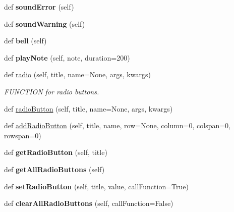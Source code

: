 \begin{DoxyCompactItemize}
def {\bfseries sound\+Error} (self)
\item 
\mbox{\label{classappjar_1_1gui_a6f9781af1a88faa13b56a107f7cbe112}} 
def {\bfseries sound\+Warning} (self)
\item 
\mbox{\label{classappjar_1_1gui_a4eadecf4e77b7711aad3b9bdeba914fc}} 
def {\bfseries bell} (self)
\item 
\mbox{\label{classappjar_1_1gui_a6b6baed3fcc616515c191c38115c80b7}} 
def {\bfseries play\+Note} (self, note, duration=200)
\item 
def \hyperlink{classappjar_1_1gui_af5cc0fdb337b9cccf09708697e0e4640}{radio} (self, title, name=None, args, kwargs)
\begin{DoxyCompactList}\small\item\em F\+U\+N\+C\+T\+I\+ON for radio buttons. \end{DoxyCompactList}\item 
def \hyperlink{classappjar_1_1gui_a124d04efc7d2e554655f0f1a8c7f4177}{radio\+Button} (self, title, name=None, args, kwargs)
\item 
def \hyperlink{classappjar_1_1gui_a43740305a4b98237f344c3228d593467}{add\+Radio\+Button} (self, title, name, row=None, column=0, colspan=0, rowspan=0)
\item 
\mbox{\label{classappjar_1_1gui_a3a862f8c65a08dc6c0f86ccb605f0d6f}} 
def {\bfseries get\+Radio\+Button} (self, title)
\item 
\mbox{\label{classappjar_1_1gui_ac6707d0a60eaecf1d39aa52d931a43dc}} 
def {\bfseries get\+All\+Radio\+Buttons} (self)
\item 
\mbox{\label{classappjar_1_1gui_ae5d26a32ac8d2ddfcf8016524980da29}} 
def {\bfseries set\+Radio\+Button} (self, title, value, call\+Function=True)
\item 
\mbox{\label{classappjar_1_1gui_a07d2fbf77022faf5cae16fdd48419177}} 
def {\bfseries clear\+All\+Radio\+Buttons} (self, call\+Function=False)
\item 
\mbox{\label{classappjar_1_1gui_ace025043342d54e78775c0ea7d152dfa}} 

\end{DoxyCompactItemize}
